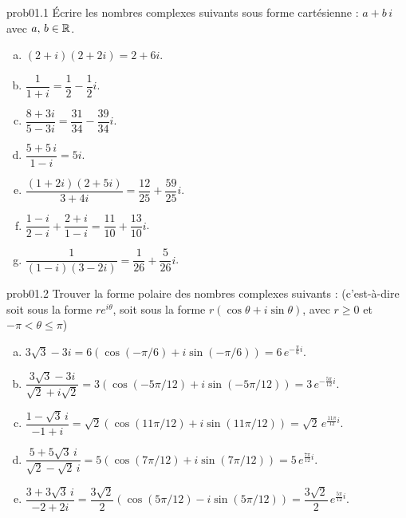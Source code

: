 
\begin{sol}{prob01.1} Écrire les nombres complexes suivants sous forme cartésienne : $a + b \,i$ avec $a,\, b \in \mathbb{R}$.
\medskip
\begin{enumerate}[a)]
\item    $(2+i)(2+2 i)=2+6i$. \medskip  
\item $ \dfrac 1{1+i}=\dfrac{1}{2}- \dfrac{1}{2} i$.\medskip 
\item $  \dfrac{8+3i}{5-3i}=\dfrac{31}{34}-\dfrac{39}{34}i$.\medskip 
\item $\dfrac{5+5 \,i}{1-i}= 5 i$.\medskip
% 
\item $\dfrac{(1+2i)(2+5i)}{3+4i}=\dfrac{ 12}{25} +\dfrac{59}{25}i  $.\smallskip

\item $\dfrac{1-i}{2-i}+\dfrac{2+i}{1-i}= \dfrac{11}{10}+\dfrac{13 }{10}i$.\smallskip
% 
\item $\dfrac 1{(1-i)(3-2i)}=\dfrac{1}{26}+\dfrac{5 }{26}i$.
%
\end{enumerate}
\medskip

\end{sol} 

\bigskip
\begin{sol}{prob01.2} Trouver la forme polaire des nombres complexes suivants : (c'est-à-dire soit sous la forme $r e^{i\theta}$, soit sous la forme $r(\cos \theta + i \sin \theta)$, avec $r\ge 0$ et  $-\pi <\theta \le \pi$)\medskip
\begin{enumerate}[a)]

\item ${3\sqrt{3}-3i}=6(\cos (-\pi /6)+i \sin (-\pi /6))=6\, e^{-\frac{\pi}{6}i} $.\smallskip
\item $\dfrac{3\sqrt{3}-3i} {\sqrt{2}+i\sqrt{2}}=3(\cos (-5\pi /12)+i \sin (-5\pi /12)) =3\, e^{-\frac{5\pi}{12}i} $.\smallskip

\item $\dfrac{1-\sqrt{3}\,i}{-1+i}=\sqrt{2}(\cos (11\pi/12)+i\sin (11\pi /12))=\sqrt{2}\, e^{\frac{11\pi}{12}i} $.\smallskip
\item $\dfrac{5+5\sqrt{3}\,i}{\sqrt{2}-\sqrt{2}\,i}=5(\cos (7\pi /12)+i\sin (7\pi/12))= 5\,e^{\frac{7\pi}{12}i}$.\smallskip
\item $\dfrac{3+3\sqrt{3}\,i} {-2+2i}=\dfrac{3\sqrt{2}}{2}(\cos (5\pi /12)-i\sin (5\pi/12))=\dfrac{3\sqrt{2}}{2}\,e^{\frac{5\pi}{12}i}$.
\end{enumerate}
\medskip

\end{sol} 



